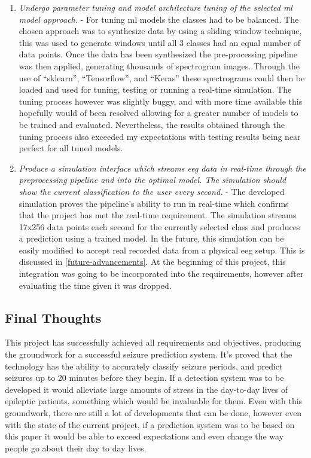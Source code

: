 \documentclass[12pt]{article}
\begin{document}
\begin{enumerate}
        
\item \textit{Undergo parameter tuning and model architecture tuning of the selected \acrshort{ml} model approach.} - For tuning \acrshort{ml} models the classes had to be balanced. The chosen approach was to synthesize data by using a sliding window technique, this was used to generate windows until all 3 classes had an equal number of data points. Once the data has been synthesized the pre-processing pipeline was then applied, generating thousands of spectrogram images. Through the use of ``sklearn'', ``Tensorflow'', and ``Keras'' these spectrograms could then be loaded and used for tuning, testing or running a real-time simulation. The tuning process however was slightly buggy, and with more time available this hopefully would of been resolved allowing for a greater number of models to be trained and evaluated. Nevertheless, the results obtained through the tuning process also exceeded my expectations with testing results being near perfect for all tuned models.
        
        
\item \textit{Produce a simulation interface which streams \acrshort{eeg} data in real-time through the preprocessing pipeline and into the optimal model. The simulation should show the current classification to the user every second.} - The developed simulation proves the pipeline's ability to run in real-time which confirms that the project has met the real-time requirement. The simulation streams 17x256 data points each second for the currently selected class and produces a prediction using a trained model. In the future, this simulation can be easily modified to accept real recorded data from a physical \acrshort{eeg} setup. This is discussed in \ref{future-advancements}. At the beginning of this project, this integration was going to be incorporated into the requirements, however after evaluating the time given it was dropped.
\end{enumerate}

\subsection{Final Thoughts}

This project has successfully achieved all requirements and objectives, producing the groundwork for a successful seizure prediction system. It's proved that the technology has the ability to accurately classify seizure periods, and predict seizures up to 20 minutes before they begin. If a detection system was to be developed it would alleviate large amounts of stress in the day-to-day lives of epileptic patients, something which would be invaluable for them. Even with this groundwork, there are still a lot of developments that can be done, however even with the state of the current project, if a prediction system was to be based on this paper it would be able to exceed expectations and even change the way people go about their day to day lives.
\end{document}
